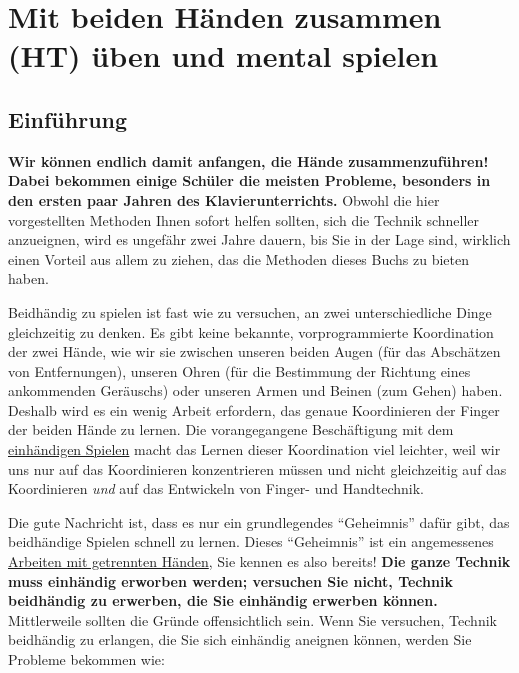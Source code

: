 
\section{Mit beiden Händen zusammen (HT) üben und mental spielen}\hypertarget{c1ii25}{}


\subsection{Einführung}\hypertarget{c1ii25a}{}

\textbf{Wir können endlich damit anfangen, die Hände zusammenzuführen!
Dabei bekommen einige Schüler die meisten Probleme, besonders in den ersten paar Jahren des Klavierunterrichts.}
Obwohl die hier vorgestellten Methoden Ihnen sofort helfen sollten, sich die Technik schneller anzueignen, wird es ungefähr zwei Jahre dauern, bis Sie in der Lage sind, wirklich einen Vorteil aus allem zu ziehen, das die Methoden dieses Buchs zu bieten haben.

Beidhändig zu spielen ist fast wie zu versuchen, an zwei unterschiedliche Dinge gleichzeitig zu denken.
Es gibt keine bekannte, vorprogrammierte Koordination der zwei Hände, wie wir sie zwischen unseren beiden Augen (für das Abschätzen von Entfernungen), unseren Ohren (für die Bestimmung der Richtung eines ankommenden Geräuschs) oder unseren Armen und Beinen (zum Gehen) haben.
Deshalb wird es ein wenig Arbeit erfordern, das genaue Koordinieren der Finger der beiden Hände zu lernen.
Die vorangegangene Beschäftigung mit dem \hyperlink{c1ii7}{einhändigen Spielen} macht das Lernen dieser Koordination viel leichter, weil wir uns nur auf das Koordinieren konzentrieren müssen und nicht gleichzeitig auf das Koordinieren \textit{und} auf das Entwickeln von Finger- und Handtechnik.

Die gute Nachricht ist, dass es nur ein grundlegendes \enquote{Geheimnis} dafür gibt, das beidhändige Spielen schnell zu lernen.
Dieses \enquote{Geheimnis} ist ein angemessenes \hyperlink{c1ii7}{Arbeiten mit getrennten Händen}, Sie kennen es also bereits!
\textbf{Die ganze Technik muss einhändig erworben werden;
versuchen Sie nicht, Technik beidhändig zu erwerben, die Sie einhändig erwerben können.}
Mittlerweile sollten die Gründe offensichtlich sein.
Wenn Sie versuchen, Technik beidhändig zu erlangen, die Sie sich einhändig aneignen können, werden Sie Probleme bekommen wie:

